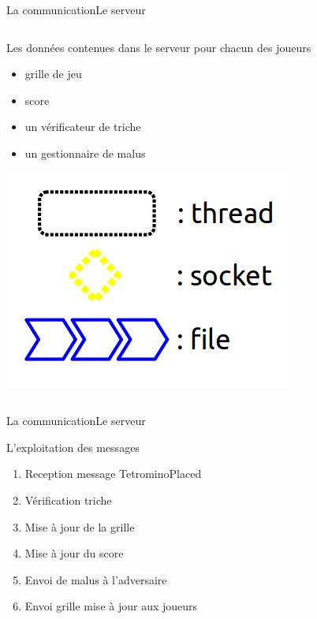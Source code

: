 \documentclass[french]{beamer}
\begin{document}
\begin{frame}{La communication}{Le serveur}
\begin{columns}
			\begin{column}{0.5\textwidth}

				\begin{block}{Les données contenues dans le serveur pour chacun des joueurs}
					\begin{itemize}
						\item grille de jeu
						\item score
						\item un vérificateur de triche
						\item un gestionnaire de malus
					\end{itemize}
				\end{block}

				\begin{center}
					\includegraphics[scale=0.25]{img/legende.png}
				\end{center}

			\end{column}

		\end{columns}
	\end{frame}




	\begin{frame}{La communication}{Le serveur}
		\begin{block}{L'exploitation des messages}
			\begin{enumerate}
				\item{Reception message TetrominoPlaced}
				\item{Vérification triche}
				\item{Mise à jour de la grille}
				\item{Mise à jour du score}
				\item{Envoi de malus à l'adversaire}
				\item{Envoi grille mise à jour aux joueurs}
			\end{enumerate}
		\end{block}

	\end{frame}
\end{document}
